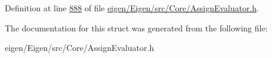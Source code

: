 Definition at line \hyperlink{eigen_2_eigen_2src_2_core_2_assign_evaluator_8h_source_l00888}{888} of file \hyperlink{eigen_2_eigen_2src_2_core_2_assign_evaluator_8h_source}{eigen/\+Eigen/src/\+Core/\+Assign\+Evaluator.\+h}.



The documentation for this struct was generated from the following file\+:\begin{DoxyCompactItemize}
\item 
eigen/\+Eigen/src/\+Core/\+Assign\+Evaluator.\+h\end{DoxyCompactItemize}
